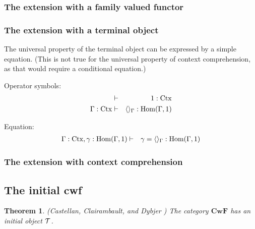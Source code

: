 \documentclass{lmcs}
\newtheorem{theorem}{Theorem}
\def\Cwf{\mathbf{CwF}}
\def\Ctx{\mathrm{Ctx}}
\def\Hom{\mathrm{Hom}}
\begin{document}
\subsubsection{The extension with a family valued functor}

\subsubsection{The extension with a terminal object}
The universal property of the terminal object can be expressed by 
a simple equation. (This is not true for the universal property of
context comprehension, as that would require a conditional equation.) 

Operator symbols:
\begin{eqnarray*}
&\vdash& 1 : \Ctx\\
\Gamma : \Ctx &\vdash& \tuple{}_\Gamma : \Hom(\Gamma,1)
\end{eqnarray*}

Equation:
\begin{eqnarray*}
\Gamma : \Ctx, \gamma : \Hom(\Gamma,1) &\vdash& \gamma = \tuple{}_\Gamma : \Hom(\Gamma,1)
\end{eqnarray*}


\subsubsection{The extension with context comprehension}

\subsection{The initial cwf}

\begin{theorem}
(Castellan, Clairambault, and Dybjer \cite{castellan:tlca2015,castellan:lmcs}) The category $\Cwf$ has an initial object ${\mathcal T}$.
\end{theorem}

\end{document}

